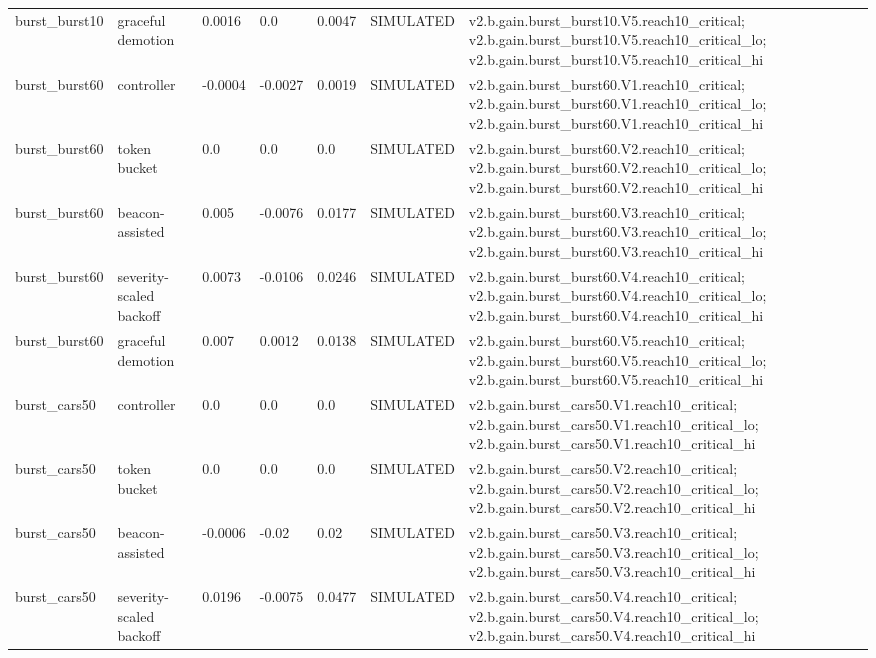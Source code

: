 \begin{table}[t]
\begin{tabular}{lllllll}
burst\_burst10 & graceful demotion & 0.0016 & 0.0 & 0.0047 & SIMULATED & v2.b.gain.burst\_burst10.V5.reach10\_critical; v2.b.gain.burst\_burst10.V5.reach10\_critical\_lo; v2.b.gain.burst\_burst10.V5.reach10\_critical\_hi \\
burst\_burst60 & controller & -0.0004 & -0.0027 & 0.0019 & SIMULATED & v2.b.gain.burst\_burst60.V1.reach10\_critical; v2.b.gain.burst\_burst60.V1.reach10\_critical\_lo; v2.b.gain.burst\_burst60.V1.reach10\_critical\_hi \\
burst\_burst60 & token bucket & 0.0 & 0.0 & 0.0 & SIMULATED & v2.b.gain.burst\_burst60.V2.reach10\_critical; v2.b.gain.burst\_burst60.V2.reach10\_critical\_lo; v2.b.gain.burst\_burst60.V2.reach10\_critical\_hi \\
burst\_burst60 & beacon-assisted & 0.005 & -0.0076 & 0.0177 & SIMULATED & v2.b.gain.burst\_burst60.V3.reach10\_critical; v2.b.gain.burst\_burst60.V3.reach10\_critical\_lo; v2.b.gain.burst\_burst60.V3.reach10\_critical\_hi \\
burst\_burst60 & severity-scaled backoff & 0.0073 & -0.0106 & 0.0246 & SIMULATED & v2.b.gain.burst\_burst60.V4.reach10\_critical; v2.b.gain.burst\_burst60.V4.reach10\_critical\_lo; v2.b.gain.burst\_burst60.V4.reach10\_critical\_hi \\
burst\_burst60 & graceful demotion & 0.007 & 0.0012 & 0.0138 & SIMULATED & v2.b.gain.burst\_burst60.V5.reach10\_critical; v2.b.gain.burst\_burst60.V5.reach10\_critical\_lo; v2.b.gain.burst\_burst60.V5.reach10\_critical\_hi \\
burst\_cars50 & controller & 0.0 & 0.0 & 0.0 & SIMULATED & v2.b.gain.burst\_cars50.V1.reach10\_critical; v2.b.gain.burst\_cars50.V1.reach10\_critical\_lo; v2.b.gain.burst\_cars50.V1.reach10\_critical\_hi \\
burst\_cars50 & token bucket & 0.0 & 0.0 & 0.0 & SIMULATED & v2.b.gain.burst\_cars50.V2.reach10\_critical; v2.b.gain.burst\_cars50.V2.reach10\_critical\_lo; v2.b.gain.burst\_cars50.V2.reach10\_critical\_hi \\
burst\_cars50 & beacon-assisted & -0.0006 & -0.02 & 0.02 & SIMULATED & v2.b.gain.burst\_cars50.V3.reach10\_critical; v2.b.gain.burst\_cars50.V3.reach10\_critical\_lo; v2.b.gain.burst\_cars50.V3.reach10\_critical\_hi \\
burst\_cars50 & severity-scaled backoff & 0.0196 & -0.0075 & 0.0477 & SIMULATED & v2.b.gain.burst\_cars50.V4.reach10\_critical; v2.b.gain.burst\_cars50.V4.reach10\_critical\_lo; v2.b.gain.burst\_cars50.V4.reach10\_critical\_hi \\

\end{tabular}
\end{table}
